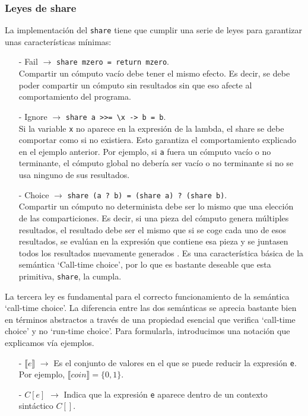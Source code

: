\documentclass[class=article, crop=false]{standalone}
\begin{document}
\subsubsection{Leyes de share}
La implementación del \verb`share` tiene que cumplir una serie de leyes para garantizar unas
características mínimas:
\begin{itemize}
  \item[-] Fail $\rightarrow$ \verb`share mzero = return mzero`. \\
  Compartir un cómputo vacío debe tener el mismo efecto. Es decir, se debe poder compartir un
  cómputo sin resultados sin que eso afecte al comportamiento del programa.
  \item[-] Ignore $\rightarrow$ \verb`share a >>= \x -> b = b`. \\
  Si la variable \verb`x` no aparece en la expresión de la lambda, el share se debe comportar
  como si no existiera. Esto garantiza el comportamiento explicado en el ejemplo anterior.
  Por ejemplo, si \verb`a` fuera un cómputo vacío o no terminante, el cómputo global no
  debería ser vacío o no terminante si no se usa ninguno de sus resultados.
  \item[-] Choice $\rightarrow$ \verb`share (a ? b) = (share a) ? (share b)`. \\
  Compartir un cómputo no determinista debe ser lo mismo que una elección de las
  comparticiones. Es decir, si una pieza del cómputo genera múltiples resultados, el
  resultado debe ser el mismo que si se coge cada uno de esos resultados, se evalúan en la
  expresión que contiene esa pieza y se juntasen todos los resultados nuevamente generados
  \cite{lopez2007simple}\cite{baader1999term}. Es una característica básica de la semántica
  `Call-time choice', por lo que es bastante deseable que esta primitiva, \verb`share`, la
  cumpla.
\end{itemize}

La tercera ley es fundamental para el correcto funcionamiento de la semántica `call-time
choice'. La diferencia entre las dos semánticas se aprecia bastante bien en términos
abstractos a través de una propiedad esencial que verifica `call-time choice' y no `run-time
choice'. Para formularla, introducimos una notación que explicamos vía ejemplos.
\begin{itemize}
  \item[-]  $\llbracket e\rrbracket$ $\rightarrow$ Es el conjunto de valores en el que se
            puede reducir la expresión \verb`e`. Por ejemplo,
            $\llbracket coin\rrbracket = \{ 0, 1\}$.
  \item[-]  $C[e]$ $\rightarrow$ Indica que la expresión \verb`e` aparece dentro de un
            contexto sintáctico $C[]$.
\end{itemize}
\end{document}

